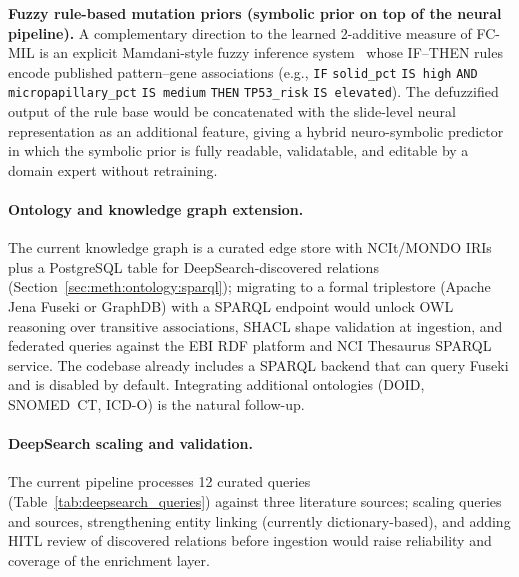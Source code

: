 \textbf{Fuzzy rule-based mutation priors (symbolic prior on top
of the neural pipeline).}
A complementary direction to the learned 2-additive measure of
FC-MIL is an explicit Mamdani-style fuzzy inference
system~\cite{mamdani1975experiment} whose IF--THEN rules encode
published pattern--gene associations
(e.g., \texttt{IF} \texttt{solid\_pct} \texttt{IS high} \texttt{AND}
\texttt{micropapillary\_pct} \texttt{IS medium} \texttt{THEN}
\texttt{TP53\_risk} \texttt{IS elevated}).
The defuzzified output of the rule base would be concatenated
with the slide-level neural representation as an additional
feature, giving a hybrid neuro-symbolic predictor in which the
symbolic prior is fully readable, validatable, and editable by a
domain expert without retraining.

\paragraph{Ontology and knowledge graph extension.}
The current knowledge graph is a curated edge store with NCIt/MONDO
IRIs plus a PostgreSQL table for DeepSearch-discovered relations
(Section~\ref{sec:meth:ontology:sparql}); migrating to a formal
triplestore (Apache Jena Fuseki or GraphDB) with a SPARQL endpoint
would unlock OWL reasoning over transitive associations, SHACL
shape validation at ingestion, and federated queries against the
EBI RDF platform and NCI Thesaurus SPARQL service.
The codebase already includes a SPARQL backend that can query
Fuseki and is disabled by default.
Integrating additional ontologies (DOID, SNOMED~CT, ICD-O) is the
natural follow-up.

\paragraph{DeepSearch scaling and validation.}
The current pipeline processes 12 curated queries
(Table~\ref{tab:deepsearch_queries}) against three literature
sources; scaling queries and sources, strengthening entity
linking (currently dictionary-based), and adding HITL review of
discovered relations before ingestion would raise reliability and
coverage of the enrichment layer.

